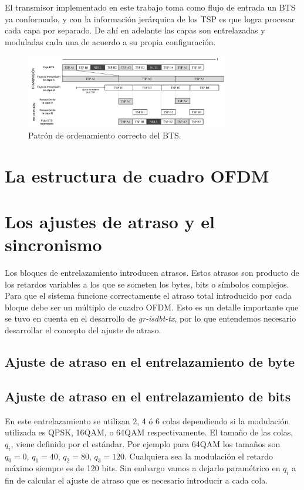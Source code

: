 \documentclass[journal,comsoc]{IEEEtran}
\begin{document}
El transmisor implementado en este trabajo toma como flujo de entrada un
BTS ya conformado, y con la información jerárquica de los TSP es que logra
procesar cada capa por separado. De ahí en adelante las capas son entrelazadas y moduladas cada una de acuerdo a su propia configuración.

\begin{figure}[!h]
\centering
\includegraphics[width=3.5in]{figuras/bts2}
\caption{Patrón de ordenamiento correcto del BTS.}
\label{bts2}
\end{figure}

\section{La estructura de cuadro OFDM}

\section{Los ajustes de atraso y el sincronismo}
Los bloques de entrelazamiento introducen atrasos. Estos atrasos son producto de los retardos variables a los que se someten los bytes, bits o símbolos complejos. Para que el sistema funcione correctamente el atraso total introducido por cada bloque debe ser un múltiplo de cuadro OFDM. Esto es un detalle importante que se tuvo en cuenta en el desarrollo de \textit{gr-isdbt-tx}, por lo que entendemos necesario desarrollar el concepto del ajuste de atraso.


\subsection{Ajuste de atraso en el entrelazamiento de byte}


\subsection{Ajuste de atraso en el entrelazamiento de bits}
En este entrelazamiento se utilizan 2, 4 ó 6 colas dependiendo si la modulación utilizada es QPSK, 16QAM, o 64QAM respectivamente. El tamaño de las colas, $q_i$, viene definido por el estándar. Por ejemplo para 64QAM los tamaños son $q_0 = 0$, $q_1 = 40$, $q_2 = 80$, $q_3 = 120$. Cualquiera sea la modulación el retardo máximo siempre es de 120 bits. Sin embargo vamos a dejarlo paramétrico en $q_i$ a fin de calcular el ajuste de atraso que es necesario introducir a cada cola.
\end{document}
